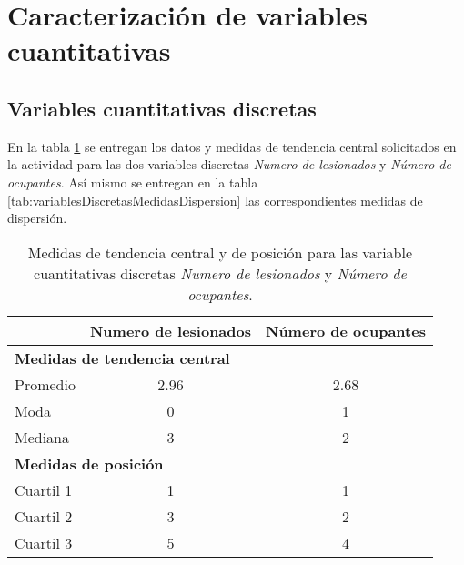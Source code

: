 \section*{Caracterización de variables cuantitativas}
\subsection*{Variables cuantitativas discretas}
En la tabla \ref{tab:variablesDiscretasMedidasCentral} se entregan los datos y medidas de tendencia central solicitados en la actividad para las dos variables discretas \emph{Numero de lesionados} y \emph{Número de ocupantes}. Así mismo se entregan en la tabla \ref{tab:variablesDiscretasMedidasDispersion} las correspondientes medidas de dispersión.\par
\begin{table}[!htbp]
    \begin{footnotesize}
        \centering
        \begin{tabular}{lc|c}
            \toprule
            {} & \textbf{Numero de lesionados} & \textbf{Número de ocupantes} \\
            \bottomrule
            \toprule
            \multicolumn{3}{l}{\textbf{Medidas de tendencia central}} \\
            \bottomrule
            Promedio & 2.96 & 2.68 \\
            \midrule
            Moda & 0 & 1\\
            \midrule
            Mediana & 3 & 2 \\
            \bottomrule
            \toprule
            \multicolumn{3}{l}{\textbf{Medidas de posición}} \\
            \bottomrule
            Cuartil 1 & 1 & 1 \\
            \midrule
            Cuartil 2 & 3 & 2 \\
            \midrule
            Cuartil 3 & 5 & 4 \\
            \bottomrule
        \end{tabular}
        \caption{\footnotesize{Medidas de tendencia central y de posición para las variable cuantitativas discretas  \emph{Numero de lesionados} y \emph{Número de ocupantes}.}}
        \label{tab:variablesDiscretasMedidasCentral}
    \end{footnotesize}
\end{table}
